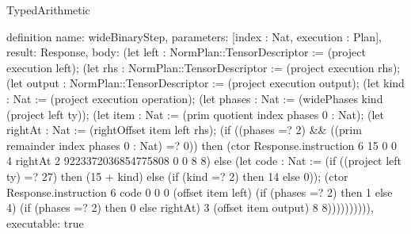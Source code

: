 \begin{lexlean}{TypedArithmetic}
\begin{semanticmodule}
definition{
  name: wideBinaryStep,
  parameters: [index : Nat, execution : Plan],
  result: Response,
  body: (let left : NormPlan::TensorDescriptor := (project execution left);
    (let rhs : NormPlan::TensorDescriptor := (project execution rhs);
    (let output : NormPlan::TensorDescriptor := (project execution output);
    (let kind : Nat := (project execution operation);
    (let phases : Nat := (widePhases kind (project left ty));
    (let item : Nat := (prim quotient index phases 0 : Nat);
    (let rightAt : Nat := (rightOffset item left rhs);
    (if ((phases =? 2) && ((prim remainder index phases 0 : Nat) =? 0)) then
      (ctor Response.instruction 6 15 0 0 4 rightAt 2 9223372036854775808 0 0 8 8) else
      (let code : Nat := (if ((project left ty) =? 27) then (15 + kind) else (if (kind =? 2) then 14 else 0));
      (ctor Response.instruction 6 code 0 0 0 (offset item left) (if (phases =? 2) then 1 else 4) (if (phases =? 2) then 0 else rightAt) 3 (offset item output) 8 8)))))))))),
  executable: true
}


\end{semanticmodule}
\end{lexlean}
